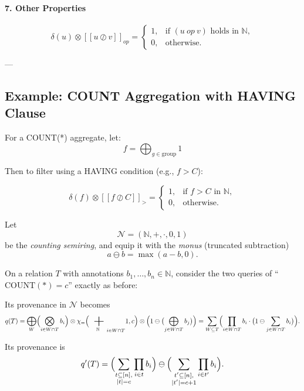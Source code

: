 \begin{toappendix}
\paragraph{7. Other Properties}
\[
\delta(u) \otimes [[u \oslash v]]_{\textit{op}} =
\begin{cases}
1, & \text{if } (u \ \textit{op}\ v) \text{ holds in } \mathbb{N}, \\
0, & \text{otherwise.}
\end{cases}
\]

---

\subsection*{Example: COUNT Aggregation with HAVING Clause}

For a COUNT(*) aggregate, let:
\[
f = \bigoplus_{g \in \text{group}} 1
\]

Then to filter using a HAVING condition (e.g., \( f > C \)):

\[
\delta(f) \otimes [[f \oslash C]]_{>} =
\begin{cases}
1, & \text{if } f > C \text{ in } \mathbb{N}, \\
0, & \text{otherwise.}
\end{cases}
\]

\end{toappendix}


Let
\[
  \mathcal{N} = (\mathbb{N},+,\cdot,0,1)
\]
be the \emph{counting semiring}, and equip it with the \emph{monus} (truncated subtraction)
\[
  a \ominus b =\max(a - b,0).
\]

On a relation \(T\) with annotations \(b_1,\dots,b_n\in\mathbb{N}\), consider the two queries of 
“\(\mathrm{COUNT}(*) = c\)” exactly as before:



Its provenance in \(\mathcal{N}\) becomes
\[
  q(T)
  =
  \bigoplus_{W}
    \Bigl(\bigotimes_{i\in W\cap T}b_i\Bigr)\otimes\chi_{=}\Bigl({\bigplus_{\mathbb{N}}}_{i\in W\cap T} 1, c\Bigr)\otimes\Bigl(1 \ominus \bigl(\bigoplus_{j\in W\cap T}b_j\bigr)\Bigr)
  =
  \sum_{W\subseteq T}
    \Bigl(\prod_{i\in W\cap T}b_i\cdot\bigl(1\ominus\sum_{j\in W\cap T}b_i\bigr)\Bigr).
\]

Its provenance is
\[
  q'(T)
  =
  \Bigl(\sum_{\substack{t\subseteq[n],\\|t|=c}}\prod_{i\in t}b_i\Bigr)
  \ominus
  \Bigl(\sum_{\substack{t'\subseteq[n],\\|t'|=c+1}}\prod_{i\in t'}b_i\Bigr).
\]

